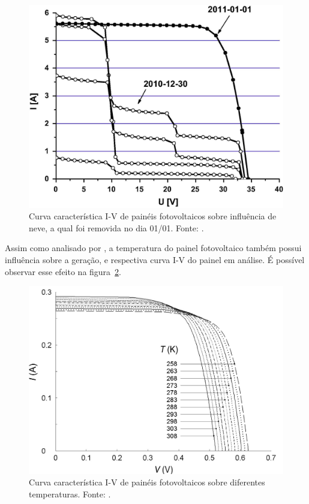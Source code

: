 \FloatBarrier
\begin{figure}[!htbp]
	\centering
	\includegraphics[scale=1.25]{imagens/IxV_schill}
	\caption{Curva característica I-V de painéis fotovoltaicos sobre influência de neve, a qual foi removida no dia 01/01. Fonte: . }

	\label{fig:CurvaIVNeve}
\end{figure}
\FloatBarrier


Assim como analisado por  , a temperatura do painel fotovoltaico também possui influência sobre a geração, e respectiva curva I-V do painel em análise. É possível observar esse efeito na figura~\ref{fig:IVTemp}.

\FloatBarrier
\begin{figure}[!htbp]
	\centering
	\includegraphics[scale=0.3]{imagens/IxV_Temp}
	\caption{Curva característica I-V de painéis fotovoltaicos sobre diferentes temperaturas. Fonte: . }
	
	\label{fig:IVTemp}
\end{figure}
\FloatBarrier

